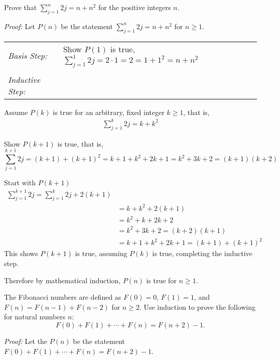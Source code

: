 \documentclass[10pt,addpoints]{exam}
\begin{document}
\begin{questions}
\printanswers


\question[10] Prove that $\displaystyle \sum_{j=1}^n 2j = n + n^2$ for the positive integers $n$.
    \ifprintanswers
        \vspace{-10pt}
   \fi
\begin{solution}
	\textit{Proof:}
	Let $P(n)$ be the statement $\sum_{j=1}^n 2j = n + n^2$ for $n \geq 1$.

	\smallskip
	\smallskip
	\begin{tabular}{lp{4in}}
	  \textit{Basis Step:} & Show $P(1)$ is true, $\sum_{j=1}^1 2j = 2\cdot 1 = 2 =  1 + 1^2 = n + n^2 $ \\
	   & \\
	 \textit{Inductive Step:} &  \\
	\end{tabular}

	Assume $P(k)$ is true for an arbitrary, fixed integer $k \geq 1$, that is,
	\begin{align*}
		\sum_{j=1}^k 2j = k + k^2 \tag{IH}
	\end{align*}

	Show $P(k+1)$ is true, that is, 
	\[ \sum_{j=1}^{k+1} 2j = (k+1) + (k+1)^2 = k+1 + k^2 + 2k + 1 = k^2 + 3k + 2 = (k+1)(k+2) \]

	Start with $P(k+1)$ 
	\begin{align*}
		\sum_{j=1}^{k+1} 2j = \sum_{j=1}^k 2j + 2(k+1) \\
		&= k + k^2 +  2(k+1) \tag{IH} \\
		&= k^2 + k + 2k + 2 \\
		&= k^2 + 3k + 2 = (k+2)(k+1) \\
		&= k+1 + k^2 + 2k + 1 = (k+1) + (k+1)^2 \tag{alternatively} 
	\end{align*}
	This shows $P(k+1)$ is true, assuming $P(k)$ is true, completing the inductive step.

	Therefore by mathematical induction, $P(n)$ is true for $n \geq 1$.
\end{solution}


\question[12] The Fibonacci numbers are defined as $F(0) = 0$, $F(1) = 1$, and $F(n) = F(n-1) + F(n-2)$ for $n \geq 2$.   Use induction to prove the following for natural numbers $n$:
\[ F(0) + F(1) + \cdots + F(n) = F(n+2) - 1.  \]
    \ifprintanswers
        \vspace{-10pt}
   \fi
\begin{solution}
	\textit{Proof:}
	Let the $P(n)$ be the statement $F(0) + F(1) + \cdots + F(n) = F(n+2) -1$.


\end{solution}
\end{questions}
\end{document}
